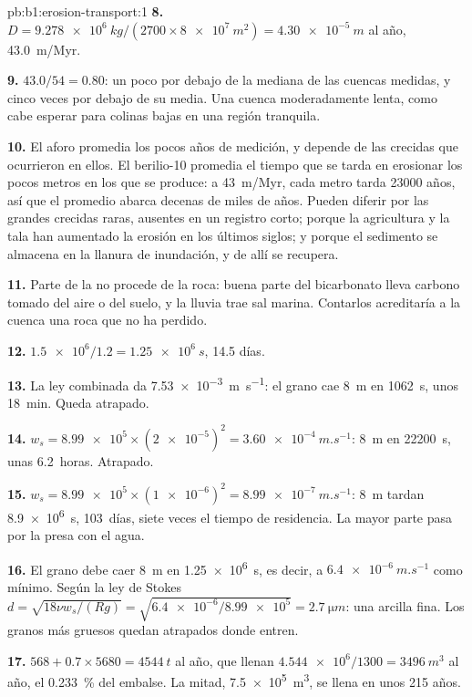 \begin{solution}{pb:b1:erosion-transport:1}
\textbf{8.} $D = \qty{9.278e6}{kg}/(2700 \times \qty{8e7}{m^2}) =
\qty{4.30e-5}{m}$ al año, \qty{43.0}{m/Myr}.

\textbf{9.} $43.0/54 = 0.80$: un poco por debajo de la mediana de las cuencas medidas, y cinco veces por debajo de su media. Una cuenca moderadamente
lenta, como cabe esperar para colinas bajas en una región tranquila.

\textbf{10.} El aforo promedia los pocos años de medición, y depende de las crecidas que ocurrieron en ellos. El berilio-10 promedia el tiempo que se tarda en
erosionar los pocos metros en los que se produce: a \qty{43}{m/Myr}, cada metro tarda \num{23000} años, así que el promedio abarca decenas de miles de años. Pueden
diferir por las grandes crecidas raras, ausentes en un registro corto; porque la agricultura y la tala han aumentado la erosión en los últimos siglos; y porque el
sedimento se almacena en la llanura de inundación, y de allí se recupera.

\textbf{11.} Parte de la  no procede de la roca: buena parte del bicarbonato lleva carbono tomado del aire o del suelo, y la lluvia trae sal marina.
Contarlos acreditaría a la cuenca una roca que no ha perdido.

\textbf{12.} $\num{1.5e6}/1.2 = \qty{1.25e6}{s}$, \num{14.5} días.

\textbf{13.} La ley combinada da \qty{7.53e-3}{m.s^{-1}}: el grano cae
\qty{8}{m} en \qty{1062}{s}, unos \qty{18}{min}. Queda atrapado.

\textbf{14.} $w_s = \num{8.99e5} \times (\num{2e-5})^2 =
\qty{3.60e-4}{m.s^{-1}}$: \qty{8}{m} en \qty{22200}{s}, unas \num{6.2}~horas.
Atrapado.

\textbf{15.} $w_s = \num{8.99e5} \times (\num{1e-6})^2 =
\qty{8.99e-7}{m.s^{-1}}$: \qty{8}{m} tardan \qty{8.9e6}{s}, \num{103}~días, siete
veces el tiempo de residencia. La mayor parte pasa por la presa con el agua.

\textbf{16.} El grano debe caer \qty{8}{m} en \qty{1.25e6}{s}, es decir, a $\qty{6.4e-6}{m.s^{-1}}$ como mínimo. Según la ley de Stokes $d = \sqrt{18\nu
w_s/(Rg)} = \sqrt{\num{6.4e-6}/\num{8.99e5}} = \qty{2.7}{\micro m}$: una arcilla fina. Los granos más gruesos quedan atrapados donde entren.

\textbf{17.} $568 + 0.7 \times 5680 = \qty{4544}{t}$ al año, que llenan
$\num{4.544e6}/1300 = \qty{3496}{m^3}$ al año, el \qty{0.233}{\percent} del
embalse. La mitad, \qty{7.5e5}{m^3}, se llena en unos \num{215} años.


\end{solution}
